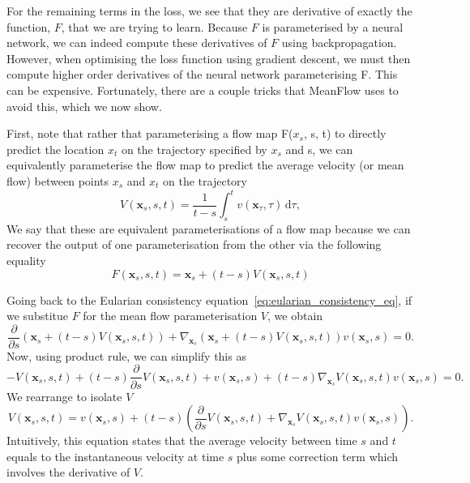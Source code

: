\documentclass[12pt,a4paper]{report}
\begin{document}
For the remaining terms in the loss, we see that they are derivative of exactly the function, $F$, that we are trying to learn. Because $F$ is parameterised by a neural network, we can indeed compute these derivatives of $F$ using backpropagation. However, when optimising the loss function using gradient descent, we must then compute higher order derivatives of the neural network parameterising F. This can be expensive. Fortunately, there are a couple tricks that MeanFlow uses to avoid this, which we now show. 

First, note that rather that parameterising a flow map F($x_s$, s, t) to directly predict the location $x_t$ on the trajectory specified by $x_s$ and s, we can equivalently parameterise the flow map to predict the average velocity (or mean flow) between points $x_s$ and $x_t$ on the trajectory 
$$V(\mathbf{x}_s, s, t) = \frac{1}{t - s} \int_s^t v(\mathbf{x}_\tau, \tau) \, \mathrm{d}\tau,$$
We say that these are equivalent parameterisations of a flow map because we can recover the output of one parameterisation from the other via the following equality
$$F(\mathbf{x}_s, s, t) = \mathbf{x}_s + (t - s) V(\mathbf{x}_s, s, t)$$

Going back to the Eularian consistency equation~\ref{eq:eularian_consistency_eq}, if we substitue $F$ for the mean flow parameterisation $V$, we obtain 
$$\frac{\partial}{\partial s} \left( \mathbf{x}_s + (t - s)V(\mathbf{x}_s, s, t) \right) + \nabla_{\mathbf{x}_s} \left( \mathbf{x}_s + (t - s)V(\mathbf{x}_s, s, t) \right) v(\mathbf{x}_s, s) = 0.$$
Now, using product rule, we can simplify this as
\begin{equation}
  \label{eq:MeanFlow_LHS}
  -V(\mathbf{x}_s, s, t) + (t - s) \frac{\partial}{\partial s} V(\mathbf{x}_s, s, t) + v(\mathbf{x}_s, s) + (t - s) \nabla_{\mathbf{x}_s} V(\mathbf{x}_s, s, t) v(\mathbf{x}_s, s) = 0.
\end{equation}
We rearrange to isolate $V$
$$V(\mathbf{x}_s, s, t) = v(\mathbf{x}_s, s) + (t - s) \left( \frac{\partial}{\partial s} V(\mathbf{x}_s, s, t) + \nabla_{\mathbf{x}_s} V(\mathbf{x}_s, s, t) v(\mathbf{x}_s, s) \right).$$
Intuitively, this equation states that the average velocity between time $s$ and $t$ equals to the instantaneous velocity at time $s$ plus some correction term which involves the derivative of $V$.
\end{document}

